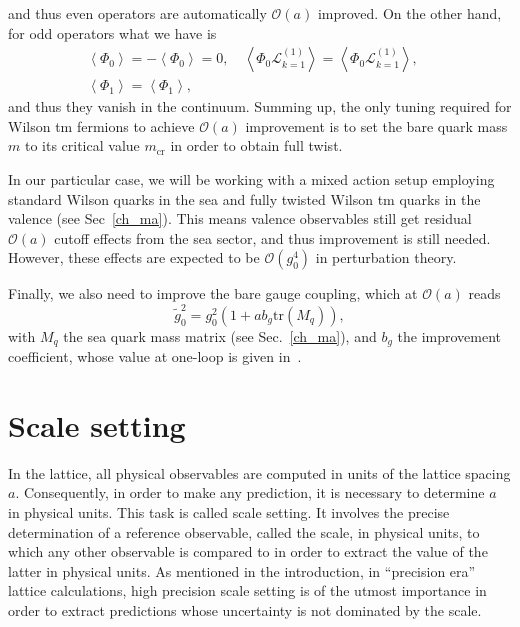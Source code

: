 and thus even operators are automatically $\mathcal{O}(a)$ improved. On the other hand, for odd operators what we have is
\begin{gather}
\left<\Phi_0\right>=-\left<\Phi_0\right>=0, \quad
\left<\Phi_0\mathcal{L}^{(1)}_{k=1}\right>=\left<\Phi_0\mathcal{L}^{(1)}_{k=1}\right>, \quad \\ \left<\Phi_1\right>=\left<\Phi_1\right>,
\end{gather}
and thus they vanish in the continuum. Summing up, the only tuning required for Wilson tm fermions to achieve $\mathcal{O}(a)$ improvement is to set the bare quark mass $m$ to its critical value $m_{\textrm{cr}}$ in order to obtain full twist.

In our particular case, we will be working with a mixed action setup employing standard Wilson quarks in the sea and fully twisted Wilson tm quarks in the valence (see Sec~\ref{ch_ma}). This means valence observables still get residual $\mathcal{O}(a)$ cutoff effects from the sea sector, and thus improvement is still needed. However, these effects are expected to be $\mathcal{O}(g_0^4)$ in perturbation theory.

Finally, we also need to improve the bare gauge coupling, which at $\mathcal{O}(a)$ reads
\begin{equation}
\tilde{g}_0^2=g_0^2\left(1+ab_g{\textrm{tr}}\left(M_q\right)\right),
\end{equation}
with $M_q$ the sea quark mass matrix (see Sec.~\ref{ch_ma}), and $b_g$ the improvement coefficient, whose value at one-loop is given in~\citep{Luscher:1996sc}.


\section{Scale setting}
\label{ch_foundation:sec:ss}

In the lattice, all physical observables are computed in units of the lattice spacing $a$. Consequently, in order to make any prediction, it is necessary to determine $a$ in physical units. This task is called scale setting. It involves the precise determination of a reference observable, called the scale, in physical units, to which any other observable is compared to in order to extract the value of the latter in physical units. As mentioned in the introduction, in ``precision era'' lattice calculations, high precision scale setting is of the utmost importance in order to extract predictions whose uncertainty is not dominated by the scale. 

